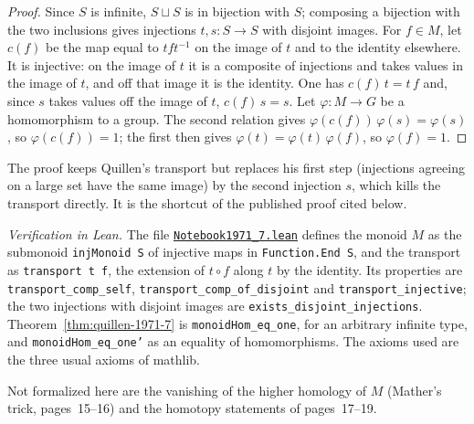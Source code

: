 \begin{proof}
Since $S$ is infinite, $S \sqcup S$ is in bijection with $S$; composing a bijection with the two inclusions gives injections $t, s : S \to S$ with disjoint images. For $f \in M$, let $c(f)$ be the map equal to $t f t^{-1}$ on the image of $t$ and to the identity elsewhere. It is injective: on the image of $t$ it is a composite of injections and takes values in the image of $t$, and off that image it is the identity. One has $c(f)\, t = t\, f$ and, since $s$ takes values off the image of $t$, $c(f)\, s = s$. Let $\varphi : M \to G$ be a homomorphism to a group. The second relation gives $\varphi(c(f))\,\varphi(s) = \varphi(s)$, so $\varphi(c(f)) = 1$; the first then gives $\varphi(t) = \varphi(t)\,\varphi(f)$, so $\varphi(f) = 1$.
\end{proof}

\noindent The proof keeps Quillen's transport but replaces his first step (injections agreeing on a large set have the same image) by the second injection $s$, which kills the transport directly. It is the shortcut of the published proof cited below.

\emph{Verification in Lean.} The file \href{\leanblobmain/Notebook1971_7.lean}{\texttt{Notebook1971\_7.\allowbreak{}lean}} defines the monoid $M$ as the submonoid \texttt{injMonoid S} of injective maps in \texttt{Function.End S}, and the transport as \texttt{transport t f}, the extension of $t \circ f$ along $t$ by the identity. Its properties are \texttt{transport\_comp\_self}, \texttt{transport\_comp\_of\_disjoint} and \texttt{transport\_injective}; the two injections with disjoint images are \texttt{exists\_disjoint\_injections}. Theorem~\ref{thm:quillen-1971-7} is \texttt{monoidHom\_eq\_one}, for an arbitrary infinite type, and \texttt{monoidHom\_eq\_one'} as an equality of homomorphisms. The axioms used are the three usual axioms of mathlib.

Not formalized here are the vanishing of the higher homology of $M$ (Mather's trick, pages~15--16) and the homotopy statements of pages~17--19.


